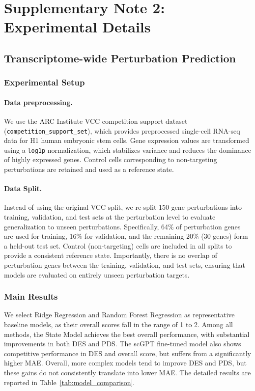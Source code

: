 \documentclass[conference]{IEEEtran}
\begin{document}
\section{Supplementary Note 2: Experimental Details}

\subsection{Transcriptome-wide Perturbation Prediction}

\subsubsection{Experimental Setup}

\paragraph{Data preprocessing.}
We use the ARC Institute VCC competition support dataset (\texttt{competition\_support\_set}),
which provides preprocessed single-cell RNA-seq data for H1 human embryonic stem cells.
Gene expression values are transformed using a \texttt{log1p} normalization,
which stabilizes variance and reduces the dominance of highly expressed genes.
Control cells corresponding to non-targeting perturbations are retained and used as a reference state.

\paragraph{Data Split.}

Instead of using the original VCC split, we re-split 150 gene perturbations into training, validation, and test sets at the perturbation level to evaluate generalization to unseen perturbations.
Specifically, 64\% of perturbation genes are used for training, 16\% for validation, and the remaining 20\% (30 genes) form a held-out test set.
Control (non-targeting) cells are included in all splits to provide a consistent reference state.
Importantly, there is no overlap of perturbation genes between the training, validation, and test sets, ensuring that models are evaluated on entirely unseen perturbation targets.

\subsubsection{Main Results}
    
We select Ridge Regression and Random Forest Regression as representative baseline models, as their overall scores fall in the range of 1  to 2. Among all methods, the State Model achieves the best overall performance, with substantial improvements in both DES and PDS. The scGPT fine-tuned model also shows competitive performance in DES and overall score, but suffers from a significantly higher MAE. Overall, more complex models tend to improve DES and PDS, but these gains do not consistently translate into lower MAE. The detailed results are reported in Table~\ref{tab:model_comparison}.
\end{document}
